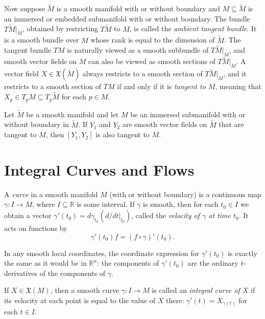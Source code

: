 Now suppose $\tilde{M}$ is a smooth manifold with or without boundary and $M \subseteq \tilde{M}$ is an immersed or embedded submanifold with or without boundary. The bundle $T\tilde{M}|_M$, obtained by restricting $T\tilde{M}$ to $M$, is called the \emph{ambient tangent bundle}. It is a smooth bundle over $M$ whose rank is equal to the dimension of $\tilde{M}$. The tangent bundle $TM$ is naturally viewed as a smooth subbundle of $T\tilde{M}|_M$, and smooth vector fields on $M$ can also be viewed as smooth sections of $T\tilde{M}|_M$. A vector field $X \in \mathfrak{X}(\tilde{M})$ always restricts to a smooth section of $T\tilde{M}|_M$, and it restricts to a smooth section of $TM$ if and only if it is \emph{tangent to $M$}, meaning that $X_p \in T_p M \subseteq T_p \tilde{M}$ for each $p \in M$.

\begin{corollary}
\label{cor:brackets-vector-fields-tangent-to-submanifolds}

Let $\tilde{M}$ be a smooth manifold and let $M$ be an immersed submanifold with or without boundary in $\tilde{M}$. If $Y_1$ and $Y_2$ are smooth vector fields on $\tilde{M}$ that are tangent to $M$, then $[Y_1, Y_2]$ is also tangent to $M$.
\end{corollary}

\section{Integral Curves and Flows}

A \emph{curve} in a smooth manifold $M$ (with or without boundary) is a continuous map $\gamma: I \to M$, where $I \subseteq \mathbb{R}$ is some interval. If $\gamma$ is smooth, then for each $t_0 \in I$ we obtain a vector $\gamma'(t_0) = d\gamma_{t_0}(d/dt|_{t_0})$, called the \emph{velocity of $\gamma$ at time $t_0$}. It acts on functions by
\[
\gamma'(t_0) f = (f \circ \gamma)'(t_0).
\]

In any smooth local coordinates, the coordinate expression for $\gamma'(t_0)$ is exactly the same as it would be in $\mathbb{R}^n$: the components of $\gamma'(t_0)$ are the ordinary $t$-derivatives of the components of $\gamma$.

If $X \in \mathfrak{X}(M)$, then a smooth curve $\gamma: I \to M$ is called an \emph{integral curve of $X$} if its velocity at each point is equal to the value of $X$ there: $\gamma'(t) = X_{\gamma(t)}$ for each $t \in I$.

